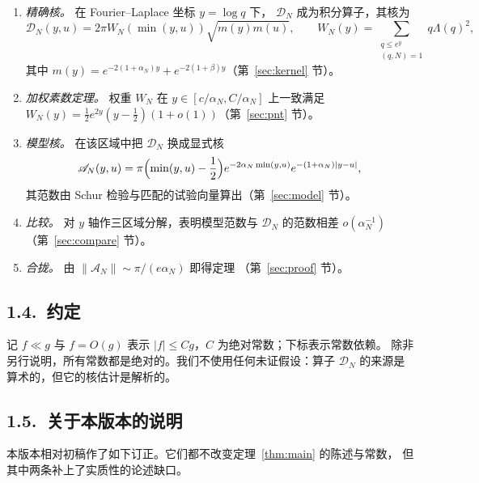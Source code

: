 \documentclass[12pt,a4paper]{amsart}
\numberwithin{equation}{section}
\theoremstyle{plain}
\theoremstyle{definition}
\begin{document}
\begin{enumerate}
\item[\rm(A)] \emph{精确核。} 在 Fourier--Laplace 坐标 $y=\log q$ 下，
$\mathcal D_N$ 成为积分算子，其核为
\[
 \mathscr D_N(y,u)=2\pi W_N(\min(y,u))\sqrt{m(y)m(u)},\qquad
 W_N(y)=\sum_{\substack{q\le e^y\\(q,N)=1}}q\Lambda(q)^2 ,
\]
其中 $m(y)=e^{-2(1+\alpha_N)y}+e^{-2(1+\beta)y}$（第~\ref{sec:kernel} 节）。
\item[\rm(B)] \emph{加权素数定理。} 权重 $W_N$ 在
$y\in[c/\alpha_N,C/\alpha_N]$ 上一致满足
$W_N(y)=\frac12e^{2y}(y-\frac12)(1+o(1))$（第~\ref{sec:pnt} 节）。
\item[\rm(C)] \emph{模型核。} 在该区域中把 $\mathscr D_N$ 换成显式核
\[
 \mathscr A_N(y,u)=\pi\Bigl(\min(y,u)-\frac12\Bigr)
 e^{-2\alpha_N\min(y,u)}e^{-(1+\alpha_N)|y-u|},
\]
其范数由 Schur 检验与匹配的试验向量算出（第~\ref{sec:model} 节）。
\item[\rm(D)] \emph{比较。} 对 $y$ 轴作三区域分解，表明模型范数与
$\mathcal D_N$ 的范数相差 $o(\alpha_N^{-1})$（第~\ref{sec:compare} 节）。
\item[\rm(E)] \emph{合拢。} 由 $\|\mathscr A_N\|\sim\pi/(e\alpha_N)$ 即得定理
（第~\ref{sec:proof} 节）。
\end{enumerate}

\subsection*{1.4.\ 约定}

记 $f\ll g$ 与 $f=O(g)$ 表示 $|f|\le Cg$，$C$ 为绝对常数；下标表示常数依赖。
除非另行说明，所有常数都是绝对的。我们不使用任何未证假设：算子 $\mathcal D_N$
的来源是算术的，但它的核估计是解析的。

\subsection*{1.5.\ 关于本版本的说明}

本版本相对初稿作了如下订正。它们都不改变定理~\ref{thm:main} 的陈述与常数，
但其中两条补上了实质性的论述缺口。
\end{document}
